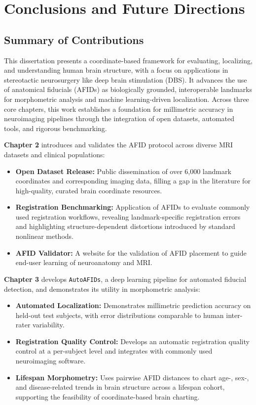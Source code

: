 \chapter{Conclusions and Future Directions}
\newpage
\sloppy
\section{Summary of Contributions}

This dissertation presents a coordinate-based framework for evaluating, localizing, and understanding human brain structure, with a focus on applications in stereotactic neurosurgery like deep brain stimulation (DBS). It advances the use of anatomical fiducials (AFIDs) as biologically grounded, interoperable landmarks for morphometric analysis and machine learning-driven localization. Across three core chapters, this work establishes a foundation for millimetric accuracy in neuroimaging pipelines through the integration of open datasets, automated tools, and rigorous benchmarking.

\textbf{Chapter 2} introduces and validates the AFID protocol across diverse MRI datasets and clinical populations:
\begin{itemize}
    \item \textbf{Open Dataset Release:} Public dissemination of over 6,000 landmark coordinates and corresponding imaging data, filling a gap in the literature for high-quality, curated brain coordinate resources.
    \item \textbf{Registration Benchmarking:} Application of AFIDs to evaluate commonly used registration workflows, revealing landmark-specific registration errors and highlighting structure-dependent distortions introduced by standard nonlinear methods.
    \item \textbf{AFID Validator:} A website for the validation of AFID placement to guide end-user learning of neuroanatomy and MRI.
\end{itemize}

\textbf{Chapter 3} develops \texttt{AutoAFIDs}, a deep learning pipeline for automated fiducial detection, and demonstrates its utility in morphometric analysis:
\begin{itemize}
    \item \textbf{Automated Localization:} Demonstrates millimetric prediction accuracy on held-out test subjects, with error distributions comparable to human inter-rater variability.
    \item \textbf{Registration Quality Control:} Develops an automatic registration quality control at a per-subject level and integrates with commonly used neuroimaging software. 
    \item \textbf{Lifespan Morphometry:} Uses pairwise AFID distances to chart age-, sex-, and disease-related trends in brain structure across a lifespan cohort, supporting the feasibility of coordinate-based brain charting.
\end{itemize}

